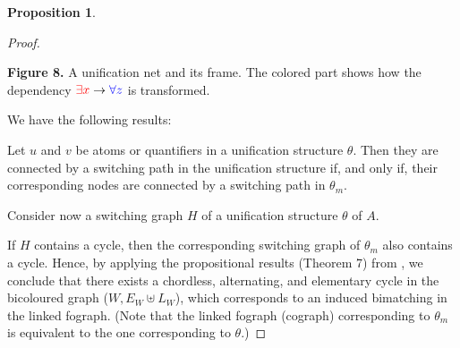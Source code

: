 \documentclass[conference,twosided,10pt]{IEEEtran}
\theoremstyle{definition}
\newtheorem{proposition}[thm]{Proposition}
\begin{document}
\begin{proposition}
\begin{proof}
\begin{center}

{\bf Figure 8.} A unification net and its frame. The colored part shows how the dependency ${\color{red} \exists x} \rightarrow {\color{blue} \forall z}$ is transformed.
\end{center}

We have the following results: 

Let $u$ and $v$ be atoms or quantifiers in a unification structure $\theta$. Then they are connected by a switching path in the unification structure if, and only if, their corresponding nodes are connected by a switching path in $\theta_m$.

Consider now a switching graph $H$ of a unification structure $\theta$ of $A$.

If $H$ contains a cycle, then the corresponding switching graph of $\theta_m$ also contains a cycle. Hence, by applying the propositional results (Theorem 7) from \cite{Retore 2003}, we conclude that there exists a chordless, alternating, and elementary cycle in the bicoloured graph ($W, E_W \uplus L_W$), which corresponds to an induced bimatching in the linked fograph. (Note that the linked fograph (cograph) corresponding to $\theta_m$ is equivalent to the one corresponding to $\theta$.)

\end{proof}
\end{proposition}
\end{document}
